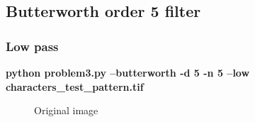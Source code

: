     \pagebreak
    \subsection{Butterworth order 5 filter}

        \subsubsection{Low pass}

        \small{\textbf{python problem3.py --butterworth -d 5 -n 5 --low characters\_test\_pattern.tif}}

        \begin{figure}[!htb]\centering
            \begin{minipage}{0.40\textwidth}
                \caption{\small{Original image}}
            \end{minipage}
            \begin{minipage}{0.40\textwidth}

\end{minipage}
\end{figure}
